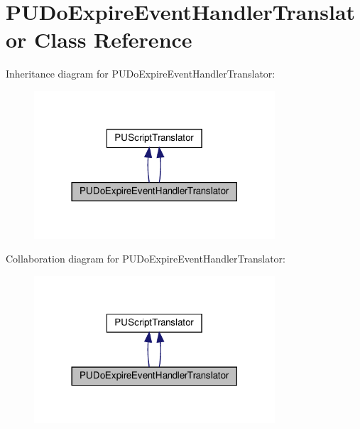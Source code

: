 \hypertarget{classPUDoExpireEventHandlerTranslator}{}\section{P\+U\+Do\+Expire\+Event\+Handler\+Translator Class Reference}
\label{classPUDoExpireEventHandlerTranslator}


Inheritance diagram for P\+U\+Do\+Expire\+Event\+Handler\+Translator\+:
\nopagebreak
\begin{figure}[H]
\begin{center}
\leavevmode
\includegraphics[width=254pt]{classPUDoExpireEventHandlerTranslator__inherit__graph}
\end{center}
\end{figure}


Collaboration diagram for P\+U\+Do\+Expire\+Event\+Handler\+Translator\+:
\nopagebreak
\begin{figure}[H]
\begin{center}
\leavevmode
\includegraphics[width=254pt]{classPUDoExpireEventHandlerTranslator__coll__graph}
\end{center}
\end{figure}

